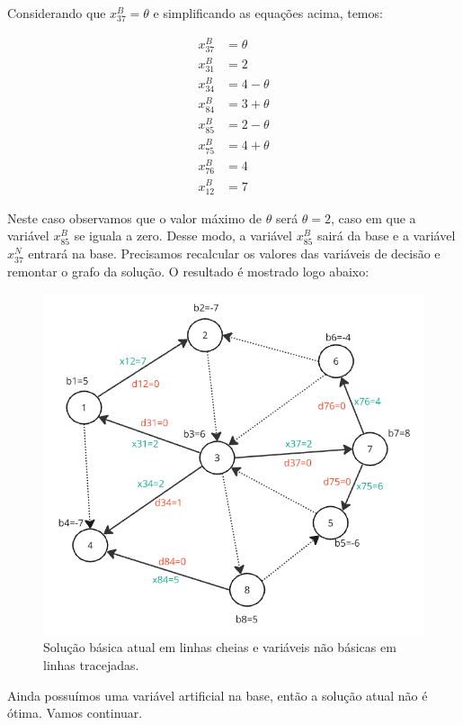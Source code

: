 \documentclass{article}
\begin{document}
Considerando que $x^{B}_{37} = \theta$ e simplificando as equações acima, temos:

\begin{align*}
    x^{B}_{37} &= \theta \\
    x^{B}_{31} &= 2 \\
    x^{B}_{34} &= 4 - \theta \\
    x^{B}_{84} &= 3 + \theta \\
    x^{B}_{85} &= 2 - \theta \\
    x^{B}_{75} &= 4 + \theta \\
    x^{B}_{76} &= 4 \\
    x^{B}_{12} &= 7
\end{align*}

Neste caso observamos que o valor máximo de $\theta$ será $\theta=2$, caso em que a variável $x^{B}_{85}$ se iguala a zero.
Desse modo, a variável $x^{B}_{85}$ sairá da base e a variável $x^{N}_{37}$ entrará na base.
Precisamos recalcular os valores das variáveis de decisão e remontar o grafo da solução.
O resultado é mostrado logo abaixo:

\begin{figure}[H]
    \centering
    \includegraphics[scale=0.7]{images/grafo-res-3.png}
    \caption{Solução básica atual em linhas cheias e variáveis não básicas em linhas tracejadas.}
\end{figure}

Ainda possuímos uma variável artificial na base, então a solução atual não é ótima.
Vamos continuar.
\end{document}
